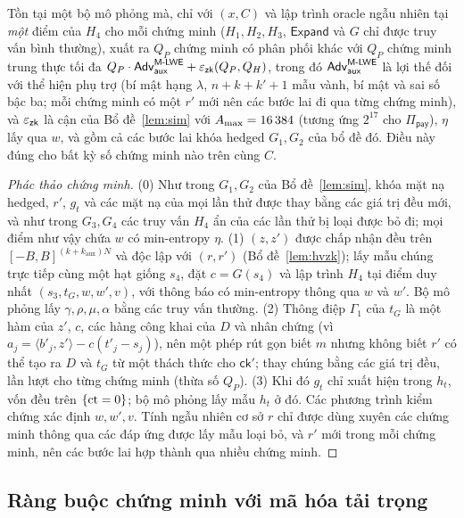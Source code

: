 \begin{theorem}
\label{thm:bin-zk}
Tồn tại một bộ mô phỏng mà, chỉ với $(x,C)$ và lập trình oracle ngẫu nhiên tại
\emph{một} điểm của $H_4$ cho mỗi chứng minh ($H_1,H_2,H_3$, $\mathsf{Expand}$
và $G$ chỉ được truy vấn bình thường), xuất ra $Q_P$ chứng minh có phân phối
khác với $Q_P$ chứng minh trung thực
tối đa $Q_P\cdot\mathsf{Adv}^{\textsf{M-LWE}}_{\mathsf{aux}}+\varepsilon_{\mathsf{zk}}(Q_P,Q_H)$, trong đó
$\mathsf{Adv}^{\textsf{M-LWE}}_{\mathsf{aux}}$ là lợi thế đối với thể hiện phụ trợ (bí mật
hạng $\lambda$, $n+k+k'+1$ mẫu vành, bí mật và sai số bậc ba; mỗi chứng minh
có một $r'$ mới nên các bước lai đi qua từng chứng minh), và $\varepsilon_{\mathsf{zk}}$ là cận
của Bổ đề~\ref{lem:sim} với $A_{\max}=16\,384$ (tương ứng $2^{17}$ cho
$\Pi_{\mathsf{pay}}$), $\eta$ lấy qua $w$, và gồm cả các bước lai khóa hedged
$G_1,G_2$ của bổ đề đó. Điều này đúng cho bất kỳ số chứng minh nào trên cùng $C$.
\end{theorem}
\begin{proof}[Phác thảo chứng minh]
(0) Như trong $G_1,G_2$ của Bổ đề~\ref{lem:sim}, khóa mặt nạ hedged, $r'$,
$g_t$ và các mặt nạ của mọi lần thử được thay bằng các giá trị đều mới, và như
trong $G_3,G_4$ các truy vấn $H_4$ ẩn của các lần thử bị loại được bỏ đi; mọi
điểm như vậy chứa $w$ có min-entropy $\eta$.
(1) $(z,z')$ được chấp nhận đều trên $[-B,B]^{(k+k_{\mathrm{aux}})N}$ và
độc lập với $(r,r')$ (Bổ đề~\ref{lem:hvzk}); lấy mẫu chúng trực tiếp cùng
một hạt giống $s_4$, đặt $c=G(s_4)$ và lập trình $H_4$ tại điểm duy nhất
$(s_3,t_G,w,w',v)$, với thông báo có min-entropy thông qua $w$ và $w'$. Bộ mô
phỏng lấy $\gamma,\rho,\mu,\alpha$ bằng các truy vấn thường.
(2) Thông điệp $\Gamma_1$ của $t_G$ là một hàm của $z'$, $c$, các hàng công
khai của $D$ và nhân chứng (vì $a_j=\langle b'_j,z'\rangle-c(t'_j-s_j)$), nên
một phép rút gọn biết $m$ nhưng không biết $r'$ có thể tạo ra $D$ và $t_G$ từ
một thách thức \MLWE{} cho $\mathsf{ck}'$; thay chúng bằng các giá trị đều,
lần lượt cho từng chứng minh (thừa số $Q_P$).
(3) Khi đó $g_t$ chỉ xuất hiện trong $h_t$, vốn đều trên $\{\mathrm{ct}=0\}$; bộ
mô phỏng lấy mẫu $h_t$ ở đó. Các phương trình kiểm chứng xác định
$w,w',v$. Tính ngẫu nhiên cơ sở $r$ chỉ được dùng xuyên các chứng minh thông
qua các đáp ứng được lấy mẫu loại bỏ, và $r'$ mới trong mỗi chứng minh, nên các
bước lai hợp thành qua nhiều chứng minh.
\end{proof}

\subsection{Ràng buộc chứng minh với mã hóa tải trọng}
\label{sec:payload-range}

